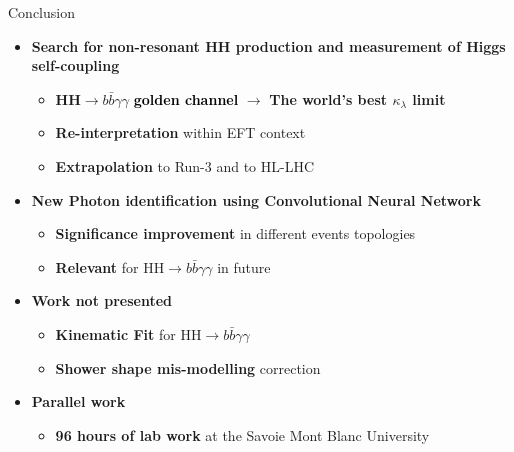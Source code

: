 \begin{frame}{Conclusion}
    \begin{itemize}
        \item \textcolor{HHturquoise_d}{\textbf{Search for non-resonant HH production and measurement of Higgs self-coupling}}
        \begin{itemize}
            \item \textbf{HH$\to b\bar{b}\gamma\gamma$} \textcolor{black}{\textbf{golden channel}} $\to$ \textcolor{HHred}{\textbf{The world's best $\kappa_{\lambda}$ limit}}
            \item \textbf{Re-interpretation} within EFT context 
            \item \textbf{Extrapolation} to Run-3 and to HL-LHC 
        \end{itemize}
        \item \textcolor{HHturquoise_d}{\textbf{New Photon identification using Convolutional Neural Network}}
        \begin{itemize}
            \item \textcolor{HHred}{\textbf{Significance improvement}} in different events topologies
            \item \textbf{Relevant} for HH$\to b\bar{b}\gamma\gamma$ in future
        \end{itemize}
        \item \textcolor{HHturquoise_d}{\textbf{Work not presented}}
        \begin{itemize}
            \item \textbf{Kinematic Fit} for HH$\to b\bar{b}\gamma\gamma$
            \item \textbf{Shower shape mis-modelling} correction
        \end{itemize}
        \item \textcolor{HHturquoise_d}{\textbf{Parallel work}}
        \begin{itemize}
            \item \textbf{96 hours of lab work} at the Savoie Mont Blanc University
        \end{itemize}
    \end{itemize}
\end{frame}

